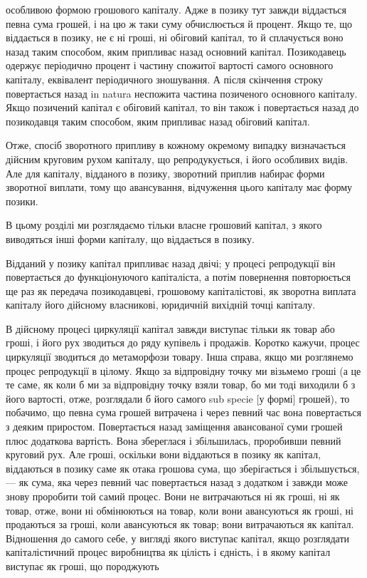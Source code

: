 особливою формою грошового капіталу. Адже в позику тут
завжди віддається певна сума грошей, і на цю ж таки суму обчислюється
й процент. Якщо те, що віддається в позику, не є ні
гроші, ні обіговий капітал, то й сплачується воно назад таким
способом, яким припливає назад основний капітал. Позикодавець
одержує періодично процент і частину спожитої вартості самого
основного капіталу, еквівалент періодичного зношування.
А після скінчення строку повертається назад in natura неспожита
частина позиченого основного капіталу. Якщо позичений
капітал є обіговий капітал, то він також і повертається назад
до позикодавця таким способом, яким припливає назад обіговий
капітал.

Отже, спосіб зворотного припливу в кожному окремому випадку
визначається дійсним круговим рухом капіталу, що репродукується,
і його особливих видів. Але для капіталу, відданого
в позику, зворотний приплив набирає форми зворотної виплати,
тому що авансування, відчуження цього капіталу має
форму позики.

В цьому розділі ми розглядаємо тільки власне грошовий капітал,
з якого виводяться інші форми капіталу, що віддається
в позику.

Відданий у позику капітал припливає назад двічі; у процесі
репродукції він повертається до функціонуючого капіталіста, а
потім повернення повторюється ще раз як передача позикодавцеві,
грошовому капіталістові, як зворотна виплата капіталу
його дійсному власникові, юридичній вихідній точці капіталу.

В дійсному процесі циркуляції капітал завжди виступає тільки
як товар або гроші, і його рух зводиться до ряду купівель і
продажів. Коротко кажучи, процес циркуляції зводиться до метаморфози
товару. Інша справа, якщо ми розглянемо процес репродукції
в цілому. Якщо за відпровідну точку ми візьмемо гроші
(а це те саме, як коли б ми за відпровідну точку взяли товар, бо ми
тоді виходили б з його вартості, отже, розглядали б його самого
sub specie [у формі] грошей), то побачимо, що певна сума
грошей витрачена і через певний час вона повертається з деяким
приростом. Повертається назад заміщення авансованої
суми грошей плюс додаткова вартість. Вона збереглася і збільшилась,
проробивши певний круговий рух. Але гроші, оскільки
вони віддаються в позику як капітал, віддаються в позику саме
як отака грошова сума, що зберігається і збільшується, — як
сума, яка через певний час повертається назад з додатком
і завжди може знову проробити той самий процес. Вони не витрачаються
ні як гроші, ні як товар, отже, вони ні обмінюються
на товар, коли вони авансуються як гроші, ні продаються за
гроші, коли авансуються як товар; вони витрачаються як капітал.
Відношення до самого себе, у вигляді якого виступає капітал,
якщо розглядати капіталістичний процес виробництва як цілість
і єдність, і в якому капітал виступає як гроші, що породжують
